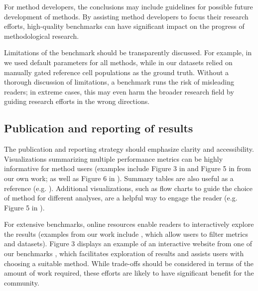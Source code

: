 For method developers, the conclusions may include guidelines for possible future development of methods. By assisting method developers to focus their research efforts, high-quality benchmarks can have significant impact on the progress of methodological research.

Limitations of the benchmark should be transparently discussed. For example, in \cite{saelens_comparisonsinglecelltrajectory_2019} we used default parameters for all methods, while in \cite{weber_comparisonclusteringmethods_2016} our datasets relied on manually gated reference cell populations as the ground truth. Without a thorough discussion of limitations, a benchmark runs the risk of misleading readers; in extreme cases, this may even harm the broader research field by guiding research efforts in the wrong directions.

\subsection{Publication and reporting of results}

The publication and reporting strategy should emphasize clarity and accessibility. Visualizations summarizing multiple performance metrics can be highly informative for method users (examples include Figure 3 in \cite{saelens_comparisonsinglecelltrajectory_2019} and Figure 5 in \cite{soneson_biasrobustnessscalability_2018} from our own work; as well as Figure 6 in \cite{korthauer_practicalguidemethods_2019}). Summary tables are also useful as a reference (e.g. \cite{weber_comparisonclusteringmethods_2016,aghaeepour_criticalassessmentautomated_2013}). Additional visualizations, such as flow charts to guide the choice of method for different analyses, are a helpful way to engage the reader (e.g. Figure 5 in \cite{saelens_comparisonsinglecelltrajectory_2019}).

For extensive benchmarks, online resources enable readers to interactively explore the results (examples from our work include \cite{saelens_comparisonsinglecelltrajectory_2019, weber_comparisonclusteringmethods_2016}, which allow users to filter metrics and datasets). Figure 3 displays an example of an interactive website from one of our benchmarks \cite{saelens_comparisonsinglecelltrajectory_2019}, which facilitates exploration of results and assists users with choosing a suitable method. While trade-offs should be considered in terms of the amount of work required, these efforts are likely to have significant benefit for the community.

